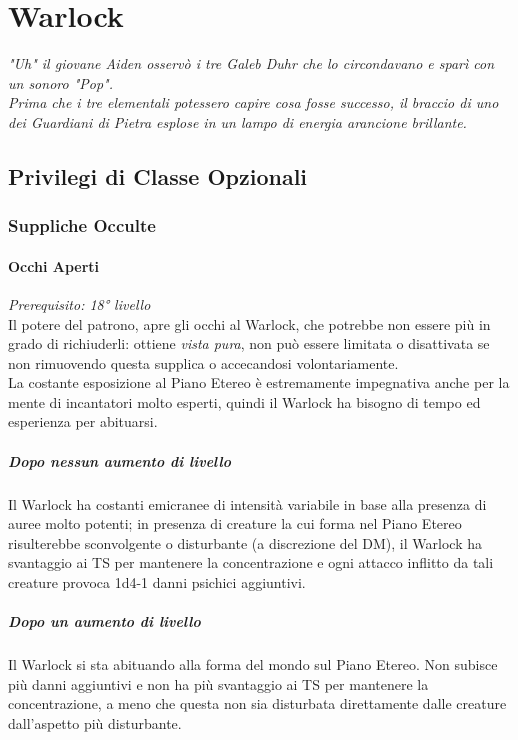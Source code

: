 \chapter{Warlock}

\begin{DndReadAloud}
  \it
  "Uh" il giovane Aiden osservò i tre Galeb Duhr che lo circondavano e sparì con un sonoro "Pop". \\ Prima che i tre elementali potessero capire cosa fosse successo, il braccio di uno dei Guardiani di Pietra esplose in un lampo di energia arancione brillante.
\end{DndReadAloud}

\section{Privilegi di Classe Opzionali}

\subsection{Suppliche Occulte}

\subsubsection{Occhi Aperti}
\textit{Prerequisito: 18° livello} \\ Il potere del patrono, apre gli occhi al Warlock, che potrebbe non essere più in grado di richiuderli: ottiene \textit{vista pura}, non può essere limitata o disattivata se non rimuovendo questa supplica o accecandosi volontariamente. \\
La costante esposizione al Piano Etereo è estremamente impegnativa anche per la mente di incantatori molto esperti, quindi il Warlock ha bisogno di tempo ed esperienza per abituarsi.
\paragraph{Dopo nessun aumento di livello}Il Warlock ha costanti emicranee di intensità variabile in base alla presenza di auree molto potenti; in presenza di creature la cui forma nel Piano Etereo risulterebbe sconvolgente o disturbante (a discrezione del DM), il Warlock ha svantaggio ai TS per mantenere la concentrazione e ogni attacco inflitto da tali creature provoca 1d4-1 danni psichici aggiuntivi.
\paragraph{Dopo un aumento di livello}Il Warlock si sta abituando alla forma del mondo sul Piano Etereo. Non subisce più danni aggiuntivi e non ha più svantaggio ai TS per mantenere la concentrazione, a meno che questa non sia disturbata direttamente dalle creature dall'aspetto più disturbante.
